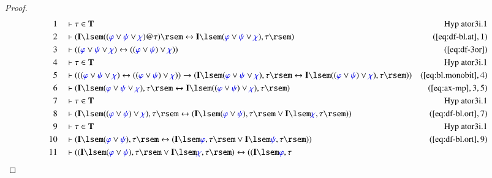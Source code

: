 \begin{proof}
\begin{align}
  1 &&  & \vdash \tau \in \mathbf{T}&\text{Hyp~ator3i.1}\notag
  \\ 2 &&  & \vdash ( \mathbf{I} \lsem ( ( \mw{\varphi} \vee \mw{\psi}
      \vee \mw{\chi} ) @ \tau ) \rsem \leftrightarrow \mathbf{I}
      \lsem ( \mw{\varphi} \vee \mw{\psi} \vee \mw{\chi} ) , \tau
      \rsem )&(\mbox{\ref{eq:df-bl.at}},1)\notag
  \\ 3 &&  & \vdash ( ( \mw{\varphi} \vee \mw{\psi} \vee \mw{\chi} )
      \leftrightarrow ( ( \mw{\varphi} \vee \mw{\psi} ) \vee \mw{\chi}
      ) )&(\mbox{\ref{eq:df-3or}})\notag
  \\ 4 &&  & \vdash \tau \in
      \mathbf{T}&\text{Hyp~ator3i.1}\notag
  \\ 5 &&  & \vdash ( ( ( \mw{\varphi} \vee \mw{\psi} \vee \mw{\chi} )
      \leftrightarrow ( ( \mw{\varphi} \vee \mw{\psi} ) \vee \mw{\chi}
      ) ) \rightarrow ( \mathbf{I} \lsem ( \mw{\varphi} \vee \mw{\psi}
      \vee \mw{\chi} ) , \tau \rsem \leftrightarrow \mathbf{I} \lsem (
      ( \mw{\varphi} \vee \mw{\psi} ) \vee \mw{\chi} ) , \tau \rsem )
      )&(\mbox{\ref{eq:bl.monobit}},4)\notag
  \\ 6 &&  & \vdash ( \mathbf{I} \lsem ( \mw{\varphi} \vee \mw{\psi}
      \vee \mw{\chi} ) , \tau \rsem \leftrightarrow \mathbf{I} \lsem (
      ( \mw{\varphi} \vee \mw{\psi} ) \vee \mw{\chi} ) , \tau \rsem
      )&(\mbox{\ref{eq:ax-mp}},3,5)\notag
  \\ 7 &&  & \vdash \tau \in
      \mathbf{T}&\text{Hyp~ator3i.1}\notag
  \\ 8 &&  & \vdash ( \mathbf{I} \lsem ( ( \mw{\varphi} \vee \mw{\psi}
      ) \vee \mw{\chi} ) , \tau \rsem \leftrightarrow ( \mathbf{I}
      \lsem ( \mw{\varphi} \vee \mw{\psi} ) , \tau \rsem \vee
      \mathbf{I} \lsem \mw{\chi} , \tau \rsem )
      )&(\mbox{\ref{eq:df-bl.ort}},7)\notag
  \\ 9 &&  & \vdash \tau \in
      \mathbf{T}&\text{Hyp~ator3i.1}\notag
  \\ 10 &&  & \vdash ( \mathbf{I} \lsem ( \mw{\varphi} \vee \mw{\psi}
      ) , \tau \rsem \leftrightarrow ( \mathbf{I} \lsem \mw{\varphi} ,
      \tau \rsem \vee \mathbf{I} \lsem \mw{\psi} , \tau \rsem )
      )&(\mbox{\ref{eq:df-bl.ort}},9)\notag
  \\ 11 &&  & \vdash ( ( \mathbf{I} \lsem ( \mw{\varphi} \vee
      \mw{\psi} ) , \tau \rsem \vee \mathbf{I} \lsem \mw{\chi} , \tau
      \rsem ) \leftrightarrow ( ( \mathbf{I} \lsem \mw{\varphi} , \tau

\end{align}
\end{proof}
